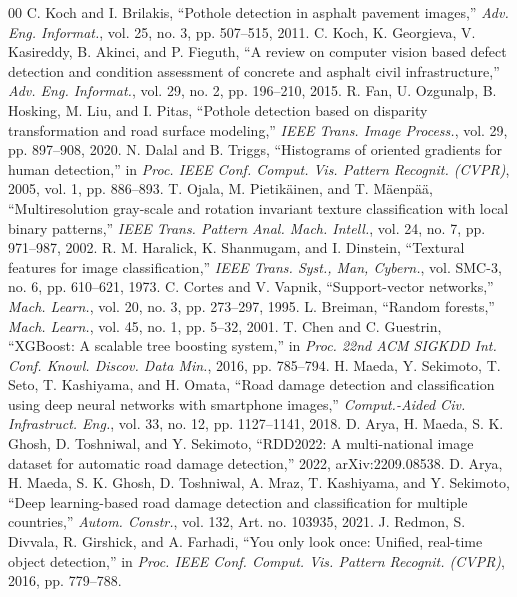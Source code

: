 \documentclass[conference]{IEEEtran}
\begin{document}
\begin{thebibliography}{00}
 C. Koch and I. Brilakis, ``Pothole detection in asphalt pavement images,'' \textit{Adv. Eng. Informat.}, vol. 25, no. 3, pp. 507--515, 2011.
 C. Koch, K. Georgieva, V. Kasireddy, B. Akinci, and P. Fieguth, ``A review on computer vision based defect detection and condition assessment of concrete and asphalt civil infrastructure,'' \textit{Adv. Eng. Informat.}, vol. 29, no. 2, pp. 196--210, 2015.
 R. Fan, U. Ozgunalp, B. Hosking, M. Liu, and I. Pitas, ``Pothole detection based on disparity transformation and road surface modeling,'' \textit{IEEE Trans. Image Process.}, vol. 29, pp. 897--908, 2020.
 N. Dalal and B. Triggs, ``Histograms of oriented gradients for human detection,'' in \textit{Proc. IEEE Conf. Comput. Vis. Pattern Recognit. (CVPR)}, 2005, vol. 1, pp. 886--893.
 T. Ojala, M. Pietik{\"a}inen, and T. M{\"a}enp{\"a}{\"a}, ``Multiresolution gray-scale and rotation invariant texture classification with local binary patterns,'' \textit{IEEE Trans. Pattern Anal. Mach. Intell.}, vol. 24, no. 7, pp. 971--987, 2002.
 R. M. Haralick, K. Shanmugam, and I. Dinstein, ``Textural features for image classification,'' \textit{IEEE Trans. Syst., Man, Cybern.}, vol. SMC-3, no. 6, pp. 610--621, 1973.
 C. Cortes and V. Vapnik, ``Support-vector networks,'' \textit{Mach. Learn.}, vol. 20, no. 3, pp. 273--297, 1995.
 L. Breiman, ``Random forests,'' \textit{Mach. Learn.}, vol. 45, no. 1, pp. 5--32, 2001.
 T. Chen and C. Guestrin, ``XGBoost: A scalable tree boosting system,'' in \textit{Proc. 22nd ACM SIGKDD Int. Conf. Knowl. Discov. Data Min.}, 2016, pp. 785--794.
 H. Maeda, Y. Sekimoto, T. Seto, T. Kashiyama, and H. Omata, ``Road damage detection and classification using deep neural networks with smartphone images,'' \textit{Comput.-Aided Civ. Infrastruct. Eng.}, vol. 33, no. 12, pp. 1127--1141, 2018.
 D. Arya, H. Maeda, S. K. Ghosh, D. Toshniwal, and Y. Sekimoto, ``RDD2022: A multi-national image dataset for automatic road damage detection,'' 2022, arXiv:2209.08538.
 D. Arya, H. Maeda, S. K. Ghosh, D. Toshniwal, A. Mraz, T. Kashiyama, and Y. Sekimoto, ``Deep learning-based road damage detection and classification for multiple countries,'' \textit{Autom. Constr.}, vol. 132, Art. no. 103935, 2021.
 J. Redmon, S. Divvala, R. Girshick, and A. Farhadi, ``You only look once: Unified, real-time object detection,'' in \textit{Proc. IEEE Conf. Comput. Vis. Pattern Recognit. (CVPR)}, 2016, pp. 779--788.

\end{thebibliography}
\end{document}
